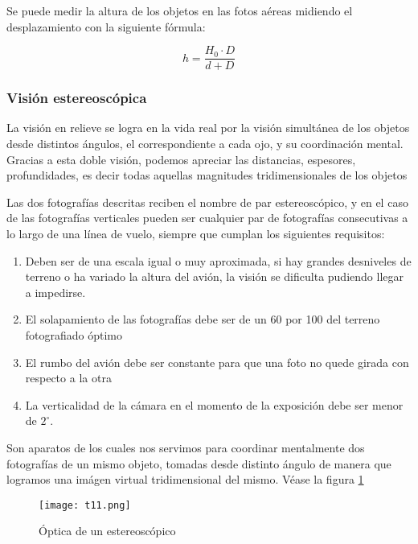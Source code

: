 Se puede medir la altura de los objetos en las fotos aéreas midiendo el desplazamiento con la siguiente fórmula:

\begin{equation}
  h=\frac{H_0\cdot D}{d+D}
\end{equation}

\subsubsection{Visión estereoscópica}

La visión en relieve se logra en la vida real por la visión simultánea de los objetos desde distintos ángulos, el correspondiente a cada ojo, y su coordinación mental. Gracias a esta doble visión, podemos apreciar las distancias, espesores, profundidades, es decir todas aquellas magnitudes tridimensionales de los objetos

Las dos fotografías descritas reciben el nombre de par estereoscópico, y en el caso de las fotografías verticales pueden ser cualquier par de fotografías consecutivas a lo largo de una línea de vuelo, siempre que cumplan los siguientes requisitos:

\begin{enumerate}
  \item Deben ser de una escala igual o muy aproximada, si hay grandes desniveles de terreno o ha variado la altura del avión, la visión se dificulta pudiendo llegar a impedirse.
  \item El solapamiento de las fotografías debe ser de un 60 por 100 del terreno fotografiado óptimo
  \item El rumbo del avión debe ser constante para que una foto no quede girada con respecto a la otra
  \item La verticalidad de la cámara en el momento de la exposición debe ser menor de $2^{\circ}$.
\end{enumerate}


\begin{definition}[Estereoscopios]
  Son aparatos de los cuales nos servimos para coordinar mentalmente dos fotografías de un mismo objeto, tomadas desde distinto ángulo de manera que logramos una imágen virtual tridimensional del mismo. Véase la figura \ref{t11}
\end{definition}

\begin{figure}[h!]
  \centerline{\texttt{[image: t11.png]}}
  \caption{Óptica de un estereoscópico}
  \label{t11}
\end{figure}

